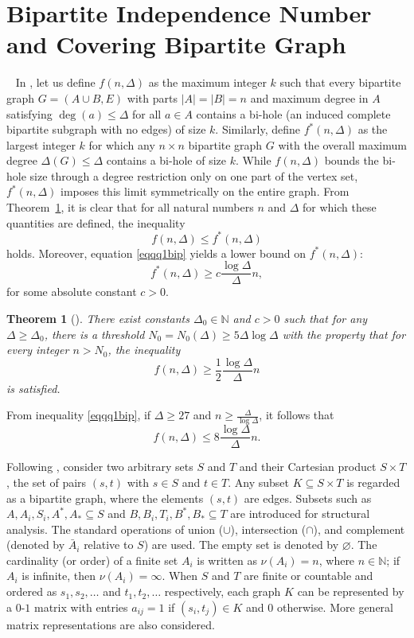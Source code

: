 \documentclass{article}
\newtheorem{theorem}{Theorem}[section]
\theoremstyle{definition}
\begin{document}
\section{Bipartite Independence Number and Covering Bipartite Graph}~\label{sec6}
In \cite{Axenovich21Sereni}, let us define $f(n, \Delta)$ as the maximum integer $k$ such that every bipartite graph $G = (A \cup B, E)$ with parts $|A| = |B| = n$ and maximum degree in $A$ satisfying $\deg(a) \le \Delta$ for all $a \in A$ contains a bi-hole (an induced complete bipartite subgraph with no edges) of size $k$. Similarly, define $f^*(n, \Delta)$ as the largest integer $k$ for which any $n \times n$ bipartite graph $G$ with the overall maximum degree $\Delta(G) \le \Delta$ contains a bi-hole of size $k$. While $f(n, \Delta)$ bounds the bi-hole size through a degree restriction only on one part of the vertex set, $f^*(n, \Delta)$ imposes this limit symmetrically on the entire graph. From Theorem~\ref{thm2number}, it is clear that for all natural numbers $n$ and $\Delta$ for which these quantities are defined, the inequality
\[
f(n, \Delta) \le f^*(n, \Delta)
\]
holds. Moreover, equation \eqref{eqqq1bip} yields a lower bound on $f^*(n, \Delta)$:
\[
f^*(n, \Delta) \ge c \frac{\log \Delta}{\Delta} n,
\]
for some absolute constant $c > 0$.

\begin{theorem}[\cite{Axenovich21Sereni}]\label{thm2number}
There exist constants $\Delta_0 \in \mathbb{N}$ and $c > 0$ such that for any $\Delta \ge \Delta_0$, there is a threshold $N_0 = N_0(\Delta) \ge 5 \Delta \log \Delta$ with the property that for every integer $n > N_0$, the inequality
\begin{equation}\label{eqqq1bip}
f(n, \Delta) \ge \frac{1}{2} \frac{\log \Delta}{\Delta} n
\end{equation}
is satisfied.
\end{theorem}

From inequality \eqref{eqqq1bip}, if $\Delta \ge 27$ and $n \ge \frac{\Delta}{\log \Delta}$, it follows that
\[
f(n, \Delta) \le 8 \frac{\log \Delta}{\Delta} n.
\]

Following \cite{Mendelsohn58Dulmage}, consider two arbitrary sets $S$ and $T$ and their Cartesian product $S \times T$, the set of pairs $(s,t)$ with $s \in S$ and $t \in T$. Any subset $K \subseteq S \times T$ is regarded as a bipartite graph, where the elements $(s,t)$ are edges. Subsets such as $A, A_i, S_i, A^{*}, A_{*} \subseteq S$ and $B, B_i, T_i, B^{*}, B_{*} \subseteq T$ are introduced for structural analysis. The standard operations of union ($\cup$), intersection ($\cap$), and complement (denoted by $\bar{A}_i$ relative to $S$) are used. The empty set is denoted by $\varnothing$. The cardinality (or order) of a finite set $A_i$ is written as $\nu(A_i) = n$, where $n \in \mathbb{N}$; if $A_i$ is infinite, then $\nu(A_i) = \infty$. When $S$ and $T$ are finite or countable and ordered as $s_1, s_2, \ldots$ and $t_1, t_2, \ldots$ respectively, each graph $K$ can be represented by a $0$-$1$ matrix with entries $a_{ij} = 1$ if $(s_i, t_j) \in K$ and $0$ otherwise. More general matrix representations are also considered.
\end{document}
